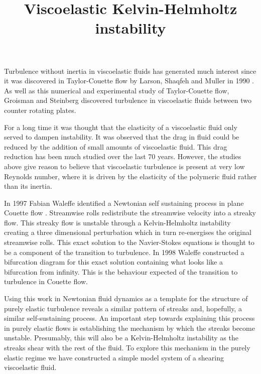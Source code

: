 \documentclass{article}
\begin{document}
\title{Viscoelastic Kelvin-Helmholtz instability}

\maketitle

Turbulence without inertia in viscoelastic fluids has generated much interest since it was discovered in Taylor-Couette flow by Larson, Shaqfeh and Muller in 1990 \cite{Larson1990}. As well as this numerical and experimental study of Taylor-Couette flow, Groisman and Steinberg \cite{Groisman2000} discovered turbulence in viscoelastic fluids between two counter rotating plates.

For a long time it was thought that the elasticity of a viscoelastic fluid only served to dampen instability. It was observed that the drag in fluid could be reduced by the addition of small amounts of viscoelastic fluid. This drag reduction has been much studied over the last 70 years. However, the studies above give reason to believe that viscoelastic turbulence is present at very low Reynolds number, where it is driven by the elasticity of the polymeric fluid rather than its inertia.

In 1997 Fabian Waleffe identified a Newtonian self sustaining process in plane Couette flow \cite{Waleffe97}. Streamwise rolls redistribute the streamwise velocity into a streaky flow. This streaky flow is unstable through a Kelvin-Helmholtz instability creating a three dimensional perturbation which in turn re-energises the original streamwise rolls. This exact solution to the Navier-Stokes equations is thought to be a component of the transition to turbulence. In 1998 Waleffe constructed a bifurcation diagram for this exact solution \cite{Waleffe98} containing what looks like a bifurcation from infinity. This is the behaviour expected of the transition to turbulence in Couette flow.

Using this work in Newtonian fluid dynamics as a template for the structure of purely elastic turbulence reveals a similar pattern of streaks and, hopefully, a similar self-sustaining process. An important step towards explaining this process in purely elastic flows is establishing the mechanism by which the streaks become unstable. Presumably, this will also be a Kelvin-Helmholtz instability as the streaks shear with the rest of the fluid. To explore this mechanism in the purely elastic regime we have constructed a simple model system of a shearing viscoelastic fluid.
\end{document}
